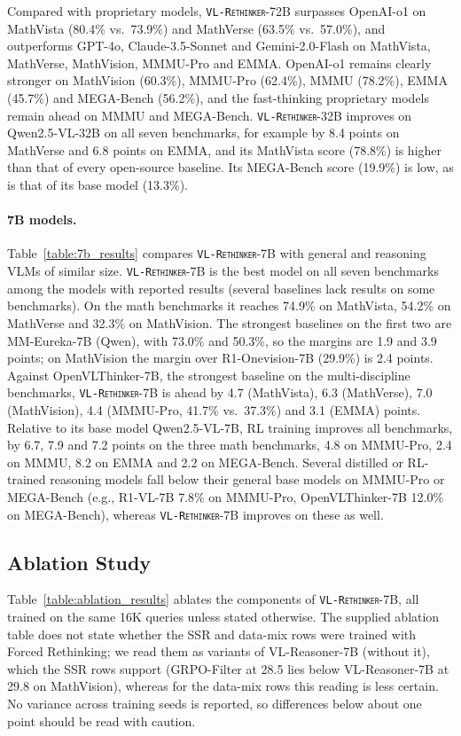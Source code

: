\documentclass{article}
\newcommand{\model}{\texttt{\textsc{VL-Rethinker}}\xspace}
\begin{document}
Compared with proprietary models, \model-72B surpasses OpenAI-o1 on MathVista (80.4\% vs.\ 73.9\%) and MathVerse (63.5\% vs.\ 57.0\%), and outperforms GPT-4o, Claude-3.5-Sonnet and Gemini-2.0-Flash on MathVista, MathVerse, MathVision, MMMU-Pro and EMMA. OpenAI-o1 remains clearly stronger on MathVision (60.3\%), MMMU-Pro (62.4\%), MMMU (78.2\%), EMMA (45.7\%) and MEGA-Bench (56.2\%), and the fast-thinking proprietary models remain ahead on MMMU and MEGA-Bench. \model-32B improves on Qwen2.5-VL-32B on all seven benchmarks, for example by 8.4 points on MathVerse and 6.8 points on EMMA, and its MathVista score (78.8\%) is higher than that of every open-source baseline. Its MEGA-Bench score (19.9\%) is low, as is that of its base model (13.3\%).



\paragraph{7B models.} Table~\ref{table:7b_results} compares \model-7B with general and reasoning VLMs of similar size. \model-7B is the best model on all seven benchmarks among the models with reported results (several baselines lack results on some benchmarks). On the math benchmarks it reaches 74.9\% on MathVista, 54.2\% on MathVerse and 32.3\% on MathVision. The strongest baselines on the first two are MM-Eureka-7B (Qwen), with 73.0\% and 50.3\%, so the margins are 1.9 and 3.9 points; on MathVision the margin over R1-Onevision-7B (29.9\%) is 2.4 points. Against OpenVLThinker-7B, the strongest baseline on the multi-discipline benchmarks, \model-7B is ahead by 4.7 (MathVista), 6.3 (MathVerse), 7.0 (MathVision), 4.4 (MMMU-Pro, 41.7\% vs.\ 37.3\%) and 3.1 (EMMA) points. Relative to its base model Qwen2.5-VL-7B, RL training improves all benchmarks, by 6.7, 7.9 and 7.2 points on the three math benchmarks, 4.8 on MMMU-Pro, 2.4 on MMMU, 8.2 on EMMA and 2.2 on MEGA-Bench. Several distilled or RL-trained reasoning models fall below their general base models on MMMU-Pro or MEGA-Bench (e.g., R1-VL-7B 7.8\% on MMMU-Pro, OpenVLThinker-7B 12.0\% on MEGA-Bench), whereas \model-7B improves on these as well.

\subsection{Ablation Study}
\label{sec:ablation}



Table~\ref{table:ablation_results} ablates the components of \model-7B, all trained on the same 16K queries unless stated otherwise. The supplied ablation table does not state whether the SSR and data-mix rows were trained with Forced Rethinking; we read them as variants of VL-Reasoner-7B (without it), which the SSR rows support (GRPO-Filter at 28.5 lies below VL-Reasoner-7B at 29.8 on MathVision), whereas for the data-mix rows this reading is less certain. No variance across training seeds is reported, so differences below about one point should be read with caution.
\end{document}
